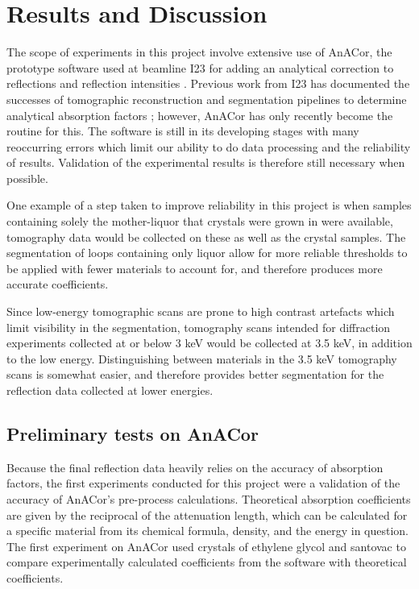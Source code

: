 \section{Results and Discussion}

The scope of experiments in this project involve extensive use of AnACor, the prototype software used at beamline I23 for adding an analytical correction to reflections and reflection intensities \cite{Lu}. Previous work from I23 has documented the successes of tomographic reconstruction and segmentation pipelines to determine analytical absorption factors \cite{Kazantsev2021}; however, AnACor has only recently become the routine for this. The software is still in its developing stages with many reoccurring errors which limit our ability to do data processing and the reliability of results. Validation of the experimental results is therefore still necessary when possible.

One example of a step taken to improve reliability in this project is when samples containing solely the mother-liquor that crystals were grown in were available, tomography data would be collected on these as well as the crystal samples. The segmentation of loops containing only liquor allow for more reliable thresholds to be applied with fewer materials to account for, and therefore produces more accurate coefficients.

Since low-energy tomographic scans are prone to high contrast artefacts which limit visibility in the segmentation, tomography scans intended for diffraction experiments collected at or below 3 keV would be collected at 3.5 keV, in addition to the low energy. Distinguishing between materials in the 3.5 keV tomography scans is somewhat easier, and therefore provides better segmentation for the reflection data collected at lower energies.


\subsection{Preliminary tests on AnACor}

Because the final reflection data heavily relies on the accuracy of absorption factors, the first experiments conducted for this project were a validation of the accuracy of AnACor's pre-process calculations. Theoretical absorption coefficients are given by the reciprocal of the attenuation length, which can be calculated for a specific material from its chemical formula, density, and the energy in question. The first experiment on AnACor used crystals of ethylene glycol and santovac to compare experimentally calculated coefficients from the software with theoretical coefficients.

